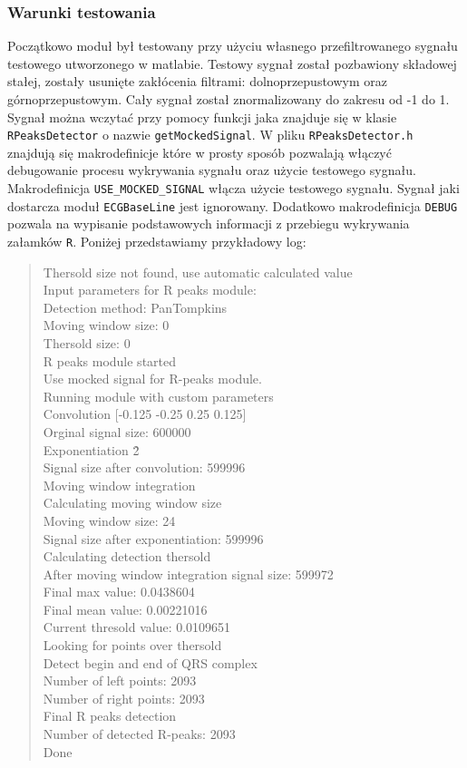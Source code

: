 \documentclass[a4paper, 11pt]{article}
\begin{document}
\subsubsection{Warunki testowania}
\label{sec:rs:tests}
Początkowo moduł był testowany przy użyciu własnego przefiltrowanego sygnału testowego utworzonego w matlabie. Testowy sygnał został pozbawiony składowej stałej, zostały usunięte zakłócenia filtrami: dolnoprzepustowym oraz górnoprzepustowym. Cały sygnał został znormalizowany do zakresu od -1 do 1.\\
\indent Sygnał można wczytać przy pomocy funkcji jaka znajduje się w klasie \verb|RPeaksDetector| o nazwie \verb|getMockedSignal|. W pliku \verb|RPeaksDetector.h| znajdują się makrodefinicje które w prosty sposób pozwalają włączyć debugowanie procesu wykrywania sygnału oraz użycie testowego sygnału.\\
\indent Makrodefinicja \verb|USE_MOCKED_SIGNAL| włącza użycie testowego sygnału. Sygnał jaki dostarcza moduł \verb|ECGBaseLine| jest ignorowany. Dodatkowo makrodefinicja \verb|DEBUG| pozwala na wypisanie podstawowych informacji z przebiegu wykrywania załamków \verb|R|. Poniżej przedstawiamy przykładowy log:
\begin{verse}
Thersold size not found, use automatic calculated value\\ 
Input parameters for R peaks module:\\
Detection method: PanTompkins\\ 
Moving window size: 0\\ 
Thersold size: 0 \\
R peaks module started \\
Use mocked signal for R-peaks module. \\
Running module with custom parameters \\
Convolution [-0.125 -0.25 0.25 0.125] \\
Orginal signal size: 600000 \\
Exponentiation \^2 \\
Signal size after convolution: 599996 \\
Moving window integration\\
Calculating moving window size\\
Moving window size: 24 \\
Signal size after exponentiation: 599996 \\
Calculating detection thersold \\
After moving window integration signal size: 599972 \\
Final max value: 0.0438604 \\
Final mean value: 0.00221016\\
Current thresold value: 0.0109651 \\
Looking for points over thersold \\
Detect begin and end of QRS complex \\
Number of left points: 2093 \\
Number of right points: 2093 \\
Final R peaks detection \\
Number of detected R-peaks: 2093 \\
Done
\end{verse}
\end{document}
